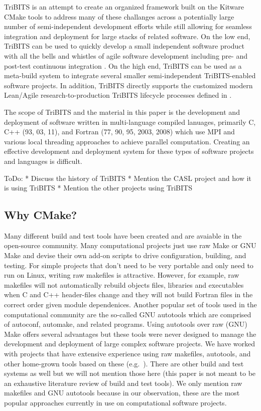 \documentclass[10pt]{article}
\begin{document}
TriBITS is an attempt to create an organized framework built on the Kitware CMake tools to address many of these challanges across a potentially large number of semi-independent development efforts while still allowing for seamless integration and deployment for large stacks of related software.  On the low end, TriBITS can be used to quickly develop a small independent software product with all the bells and whistles of agile software development including pre- and post-test continuous integration \cite{XP2, ContinuousIntegration07}.  On the high end, TriBITS can be used as a meta-build system to integrate several smaller semi-independent TriBITS-enabled software projects.  In addition, TriBITS directly supports the customized modern Lean/Agile research-to-production TriBITS lifecycle processes defined in \cite{TribitsLifecycleModel, TribitsLifecycleModel_eScience2012}.

The scope of TriBITS and the material in this paper is the development and deployment of software written in multi-language compiled lanuages, primarily C, C++ (93, 03, 11), and Fortran (77, 90, 95, 2003, 2008) which use MPI and various local threading approaches to achieve parallel computation.  Creating an effective development and deployment system for these types of software projects and languages is difficult.

ToDo:
* Discuss the history of TriBITS
* Mention the CASL project and how it is using TriBITS
* Mention the other projects using TriBITS

%
\subsection{Why CMake?}
\label{sec:why_cmake}
%

Many different build and test tools have been created and are avaiable in the open-source community.  Many computational projects just use raw Make or GNU Make and devise their own add-on scripts to drive configuration, building, and testing.  For simple projects that don't need to be very portable and only need to run on Linux, writing raw makefiles is attractive.  However, for example, raw makefiles will not automatically rebuild objects files, libraries and executables when C and C++ header-files change and they will not build Fortran files in the correct order given module dependenices.  Another popular set of tools used in the computational community are the so-called GNU autotools which are comprised of autoconf, automake, and related programs.  Using autotools over raw (GNU) Make offers several advantages but these tools were never designed to manage the development and deployment of large complex software projects.  We have worked with projects that have extensive experience using raw makefiles, autotools, and other home-grown tools based on these (e.g.\ \cite{Trilinos}).  There are other build and test systems as well but we will not mention those here (this paper is not meant to be an exhaustive literature review of build and test tools).  We only mention raw makefiles and GNU autotools because in our observation, these are the most popular approaches currently in use on computational software projects.
\end{document}
